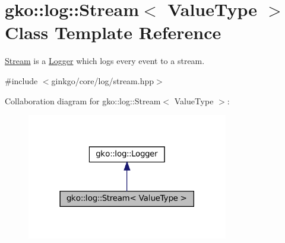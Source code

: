 \hypertarget{classgko_1_1log_1_1Stream}{}\section{gko\+:\+:log\+:\+:Stream$<$ Value\+Type $>$ Class Template Reference}
\label{classgko_1_1log_1_1Stream}


\hyperlink{classgko_1_1log_1_1Stream}{Stream} is a \hyperlink{classgko_1_1log_1_1Logger}{Logger} which logs every event to a stream.  




{\ttfamily \#include $<$ginkgo/core/log/stream.\+hpp$>$}



Collaboration diagram for gko\+:\+:log\+:\+:Stream$<$ Value\+Type $>$\+:
\nopagebreak
\begin{figure}[H]
\begin{center}
\leavevmode
\includegraphics[width=249pt]{classgko_1_1log_1_1Stream__coll__graph}
\end{center}
\end{figure}
